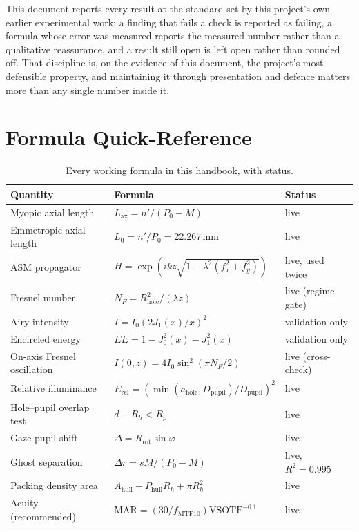 \documentclass[11pt]{report}
\begin{document}
This document reports every result at the standard set by this project's own earlier
experimental work: a finding that fails a check is reported as failing, a formula whose
error was measured reports the measured number rather than a qualitative reassurance, and a
result still open is left open rather than rounded off. That discipline is, on the evidence
of this document, the project's most defensible property, and maintaining it through
presentation and defence matters more than any single number inside it.

\appendix

\chapter{Formula Quick-Reference}

\begin{longtable}{p{5.0cm}p{6.0cm}p{2.6cm}}
\caption{Every working formula in this handbook, with status.}\\
\toprule
Quantity & Formula & Status \\
\midrule
\endhead
Myopic axial length & $L_{\text{ax}} = n'/(P_0-M)$ & live \\
Emmetropic axial length & $L_0 = n'/P_0 = 22.267$\,mm & live \\
ASM propagator & $H=\exp(ikz\sqrt{1-\lambda^2(f_x^2+f_y^2)})$ & live, used twice \\
Fresnel number & $N_F = R_{\text{hole}}^2/(\lambda z)$ & live (regime gate) \\
Airy intensity & $I=I_0(2J_1(x)/x)^2$ & validation only \\
Encircled energy & $EE = 1-J_0^2(x)-J_1^2(x)$ & validation only \\
On-axis Fresnel oscillation & $I(0,z)=4I_0\sin^2(\pi N_F/2)$ & live (cross-check) \\
Relative illuminance & $E_{\text{rel}}=(\min(a_{\text{hole}},D_{\text{pupil}})/D_{\text{pupil}})^2$
& live \\
Hole--pupil overlap test & $d-R_h<R_p$ & live \\
Gaze pupil shift & $\Delta=R_{\text{rot}}\sin\varphi$ & live \\
Ghost separation & $\Delta r = sM/(P_0-M)$ & live, $R^2=0.995$ \\
Packing density area & $A_{\text{hull}}+P_{\text{hull}}R_h+\pi R_h^2$ & live \\
Acuity (recommended) & $\text{MAR}=(30/f_{\text{MTF10}})\text{VSOTF}^{-0.1}$ & live \\

\end{longtable}
\end{document}
